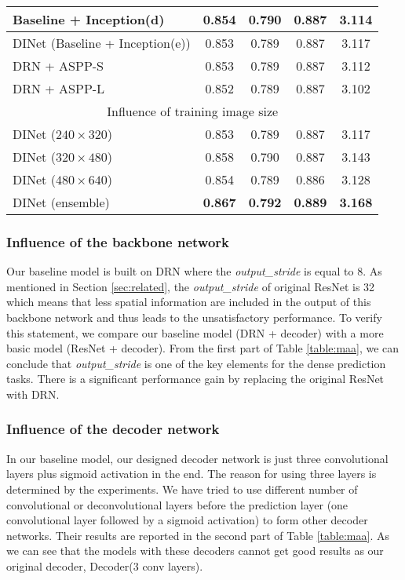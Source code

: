 \begin{table}[]
\begin{tabular}{|l|cccc|}
		Baseline + Inception(d)             & 0.854	&0.790	&0.887	&3.114 \\ \hline
		DINet (Baseline + Inception(e))  & 0.853  & 0.789 & 0.887 & 3.117 \\ \hline
		DRN + ASPP-S             & 0.853&	0.789&	0.887	&3.112 \\ \hline		
		DRN + ASPP-L            & 0.852&	0.789	&0.887	&3.102 \\ \hline \hline			
		\multicolumn{5}{|c|}{Influence of training image size}               \\ \hline
		DINet ($240 \times 320$)                      & 0.853  & 0.789 & 0.887 & 3.117 \\ \hline
		DINet ($320 \times 480$)                      & 0.858  & 0.790  & 0.887 & 3.143 \\ \hline
		DINet ($480 \times 640$)                      & 0.854  & 0.789 & 0.886 & 3.128 \\ \hline
		DINet    (ensemble)                  & \textbf{0.867}  & \textbf{0.792}  & \textbf{0.889} & \textbf{3.168} \\ \hline
	\end{tabular}
\vspace{-4mm}
\end{table}

\subsubsection{Influence of the backbone network} 
Our baseline model is built on DRN where the \emph{output\_stride} is equal to 8. As mentioned in Section \ref{sec:related}, the \emph{output\_stride} of original ResNet is 32 which means that less spatial information are included in the output of this backbone network and thus leads to the unsatisfactory performance. To verify this statement, we compare our baseline model (DRN + decoder) with a more basic model (ResNet + decoder). From the first part of Table \ref{table:maa}, we can conclude that \emph{output\_stride} is one of the key elements for the dense prediction tasks. There is a significant performance gain by replacing the original ResNet with DRN. 


\subsubsection{Influence of the decoder network} 
\label{sec:dec}
In our baseline model, our designed decoder network is just three convolutional layers plus sigmoid activation in the end. The reason for using three layers is determined by the experiments. We have tried to use different number of convolutional or deconvolutional layers before the prediction layer (one convolutional layer followed by a sigmoid activation) to form other decoder networks. Their results are reported in the second part of Table \ref{table:maa}. As we can see that the models with these decoders cannot get good results as our original decoder, \ie Decoder(3 conv layers).




